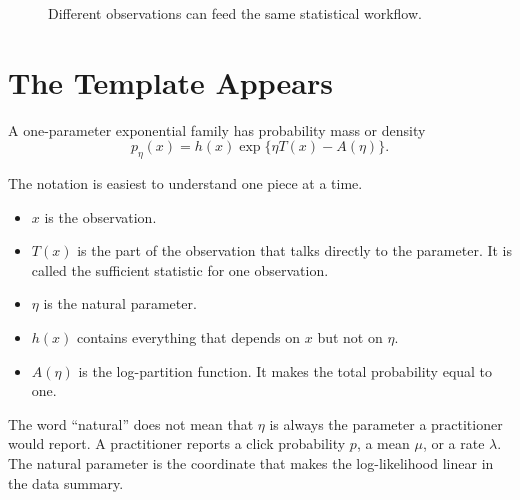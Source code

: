 \documentclass[en,nofont,11pt]{elegantbook}
\begin{document}
\begin{figure}[H]
\centering
{}
\caption{Different observations can feed the same statistical workflow.}
\end{figure}

\chapter{The Template Appears}

A one-parameter exponential family has probability mass or density
\begin{equation}
\boxed{
 p_\eta(x)
 =
 h(x)\exp\{\eta T(x)-A(\eta)\}.
}
\label{eq:canonical-family}
\end{equation}

The notation is easiest to understand one piece at a time.

\begin{itemize}
\item $x$ is the observation.
\item $T(x)$ is the part of the observation that talks directly to the parameter. It is called the sufficient statistic for one observation.
\item $\eta$ is the natural parameter.
\item $h(x)$ contains everything that depends on $x$ but not on $\eta$.
\item $A(\eta)$ is the log-partition function. It makes the total probability equal to one.
\end{itemize}

The word ``natural'' does not mean that $\eta$ is always the parameter a practitioner would report. A practitioner reports a click probability $p$, a mean $\mu$, or a rate $\lambda$. The natural parameter is the coordinate that makes the log-likelihood linear in the data summary.
\end{document}
